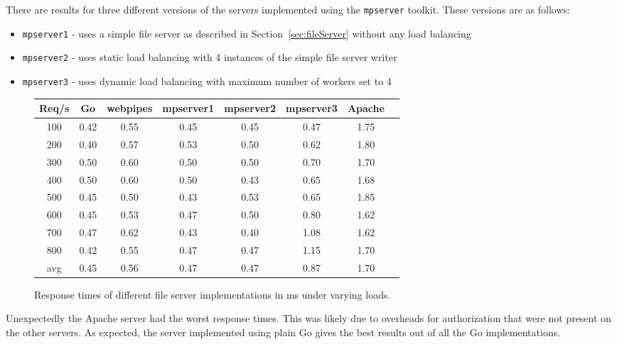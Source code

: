 There are results for three different versions of the servers implemented using 
the \texttt{mpserver} toolkit. These versions are as follows:
\begin{itemize}
	\item \texttt{mpserver1} - uses a simple file server as 
		  described in Section~\ref{sec:fileServer} without any load balancing

	\item \texttt{mpserver2} - uses static load balancing with 4 instances
		  of the simple file server writer

	\item \texttt{mpserver3} - uses dynamic load balancing with maximum number of 
		  workers set to 4
\end{itemize}

\begin{figure}[h]
\begin{center}
\begin{tabular}{|c|c|c|c|c|c|c|c|}
\hline
Req/s & Go & webpipes & mpserver1 & mpserver2 & mpserver3 & Apache\\
\hline
100 & 0.42 & 0.55 & 0.45 & 0.45 & 0.47 & 1.75 \\
200 & 0.40 & 0.57 & 0.53 & 0.50 & 0.62 & 1.80 \\
300 & 0.50 & 0.60 & 0.50 & 0.50 & 0.70 & 1.70 \\
400 & 0.50 & 0.60 & 0.50 & 0.43 & 0.65 & 1.68 \\
500 & 0.45 & 0.50 & 0.43 & 0.53 & 0.65 & 1.85 \\
600 & 0.45 & 0.53 & 0.47 & 0.50 & 0.80 & 1.62 \\
700 & 0.47 & 0.62 & 0.43 & 0.40 & 1.08 & 1.62 \\
800 & 0.42 & 0.55 & 0.47 & 0.47 & 1.15 & 1.70 \\
\hline
avg & 0.45 & 0.56 &	0.47 & 0.47 & 0.87 & 1.70 \\
\hline
\end{tabular}
\end{center}
\caption{Response times of different file server implementations in ms under varying loads.}
\label{results}
\end{figure}

Unexpectedly the Apache server had the worst response times. This was likely due to 
overheads for authorization that were not present on the other servers. As expected,
the server implemented using plain Go gives the best results out of all the Go
implementations. 

